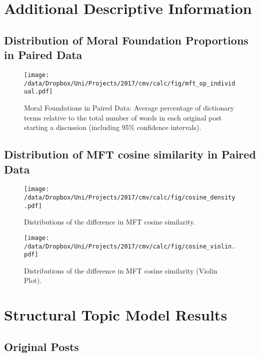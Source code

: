 \section{Additional Descriptive Information}
\renewcommand\thefigure{A.\arabic{figure}}
\renewcommand\thetable{A.\arabic{table}}
\setcounter{figure}{0}
\setcounter{table}{0}


\subsection{Distribution of Moral Foundation Proportions in Paired Data}

\begin{figure}[h]
\centering
\texttt{[image: /data/Dropbox/Uni/Projects/2017/cmv/calc/fig/mft\_op\_individual.pdf]}
\caption[Moral Foundations in Paired Data]{Moral Foundations in Paired Data: Average percentage of dictionary terms relative to the total number of words in each original post starting a discussion (including 95\% confidence intervals).}
\end{figure}


\clearpage
\subsection{Distribution of MFT cosine similarity in Paired Data}

\begin{figure}[h]
\centering
\texttt{[image: /data/Dropbox/Uni/Projects/2017/cmv/calc/fig/cosine\_density.pdf]}
\caption{Distributions of the difference in MFT cosine similarity.}
\end{figure}


\begin{figure}[h]
\centering
\texttt{[image: /data/Dropbox/Uni/Projects/2017/cmv/calc/fig/cosine\_violin.pdf]}
\caption{Distributions of the difference in MFT cosine similarity (Violin Plot).}
\end{figure}

\clearpage
\section{Structural Topic Model Results}
\renewcommand\thefigure{B.\arabic{figure}}
\renewcommand\thetable{B.\arabic{table}}
\setcounter{figure}{0}
\setcounter{table}{0}

\subsection{Original Posts}

